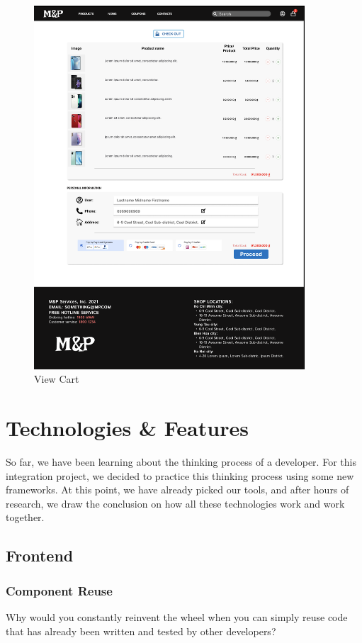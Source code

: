 \documentclass[a4paper]{article}
\numberwithin{equation}{section}
\begin{document}
\begin{figure}
  \centering
  \includegraphics[width=0.9\textwidth]{assets/p2/p4.png}
  \caption{View Cart}
\end{figure}

\newpage

\section{Technologies \& Features}
So far, we have been learning about the thinking process of a developer.
For this integration project, we decided to practice this thinking process using some new frameworks.
At this point, we have already picked our tools, and after hours of research, we draw the conclusion on how all these technologies work and work together.

\subsection{Frontend}
\subsubsection{Component Reuse}
Why would you constantly reinvent the wheel when you can simply reuse code that has already been written and tested by other developers?
\end{document}
